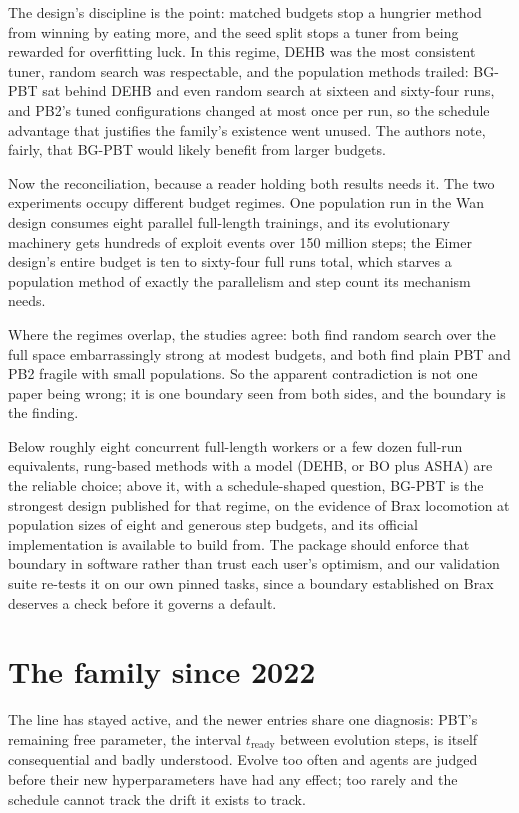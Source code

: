 The design's discipline is
the point: matched budgets stop a hungrier method from winning by
eating more, and the seed split stops a tuner from being rewarded for
overfitting luck. In this regime, DEHB was the most consistent tuner,
random search was respectable, and the population methods trailed:
BG-PBT sat behind DEHB and even random search at sixteen and
sixty-four runs, and PB2's tuned configurations changed at most once
per run, so the schedule advantage that justifies the family's
existence went unused. The authors note, fairly, that BG-PBT would
likely benefit from larger budgets.

Now the reconciliation, because a reader holding both results needs
it. The two experiments occupy different budget regimes. One
population run in the Wan design consumes eight parallel full-length
trainings, and its evolutionary machinery gets hundreds of exploit
events over 150 million steps; the Eimer design's entire budget is
ten to sixty-four full runs total, which starves a population method
of exactly the parallelism and step count its mechanism needs.

Where
the regimes overlap, the studies agree: both find random search over
the full space embarrassingly strong at modest budgets, and both find
plain PBT and PB2 fragile with small populations. So the apparent
contradiction is not one paper being wrong; it is one boundary seen
from both sides, and the boundary is the finding.

Below roughly eight
concurrent full-length workers or a few dozen full-run equivalents,
rung-based methods with a model (DEHB, or BO plus ASHA) are the
reliable choice; above it, with a schedule-shaped question, BG-PBT is
the strongest design published for that regime, on the evidence of
Brax locomotion at population sizes of eight and generous step
budgets, and its official implementation is available to build from. The package should enforce that boundary in
software rather than trust each user's optimism, and our validation
suite re-tests it on our own pinned tasks, since a boundary
established on Brax deserves a check before it governs a default.

\section{The family since 2022}

The line has stayed active, and the newer entries share one diagnosis:
PBT's remaining free parameter, the interval $t_{\mathrm{ready}}$
between evolution steps, is itself consequential and badly understood.
Evolve too often and agents are judged before their new hyperparameters
have had any effect; too rarely and the schedule cannot track the
drift it exists to track.

